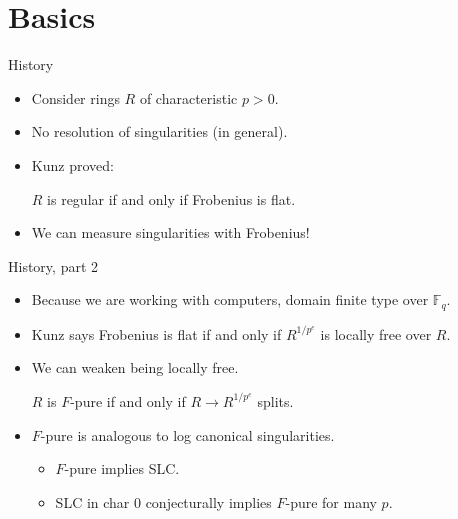 \documentclass[xcolor=dvipsnames]{beamer}
\subtitle
{The {\tt TestIdeals} package for Macaulay2}
\author[BoHeKaKaMaRoScSmTeWi] %
{Alberto F. Boix, Daniel Hern\'andez, Zhibek Kadyrsizova, Mordechai Katzman, Sara Malec, Marcus Robinson, Karl Schwede\inst{1}, Daniel Smolkin, Pedro Teixeira, Emily Witt}
\institute[AMS Sectional Meeting, University of Arkansas] %
{
  \inst{1}%
  Department of Mathematics\\
  University of Utah}
\date[2018] %
{AMS Sectional Meeting, University of Arkansas\\2018}
\newcommand{\bF}{\mathbb{F}}
\theoremstyle{remark}
\begin{document}
\begin{frame}
  \titlepage
\end{frame}






\section{Basics}

\begin{frame}[t]{History}
\begin{itemize}
\item<1-> Consider rings $R$ of characteristic $p > 0$.
\item<2-> No resolution of singularities (in general).
\item<3-> Kunz proved:
\vskip 3pt
\begin{theorem}[Kunz]
$R$ is regular if and only if Frobenius is flat.
\end{theorem}
\item<4->  We can measure singularities with Frobenius!
\end{itemize}
\end{frame}

\begin{frame}[t]{History, part 2}
\begin{itemize}
\item<1->  Because we are working with computers, domain finite type over $\bF_q$.
\item<2->  Kunz says Frobenius is flat if and only if $R^{1/p^e}$ is locally free over $R$.
\item<3->  We can weaken being locally free.
\begin{definition}
  $R$ is $F$-pure if and only if $R \to R^{1/p^e}$ splits.
\end{definition}
\item<4->  $F$-pure is analogous to log canonical singularities.
\begin{itemize}
  \item<5->  $F$-pure implies SLC.
  \item<6->  SLC in char 0 conjecturally implies $F$-pure for many $p$.
\end{itemize}
\end{itemize}
\end{frame}
\end{document}
